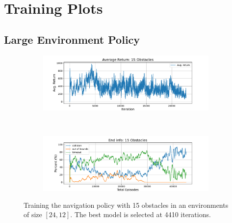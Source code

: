 \chapter{Training Plots}

\section{Large Environment Policy}
\begin{figure}[htb]
    \centering
    \begin{subfigure}[b]{\textwidth}
        \centering
        \captionsetup{justification=centering}
        \includegraphics[width=0.98\textwidth]{figures/7_/3DCarModel_BodyObs_NavSetup_15_NewObs_EnvSpace12_best3190_v1_again_reward.pdf}
        \label{fig:15_obst_nav_rew}
    \end{subfigure} \\
    \begin{subfigure}[b]{\textwidth}
        \centering
        \captionsetup{justification=centering}
        \includegraphics[width=0.98\textwidth]{figures/7_/3DCarModel_BodyObs_NavSetup_15_NewObs_EnvSpace12_best3190_v1_again_end_info.pdf}
        \label{fig:15_obst_nav_end}
    \end{subfigure} 
    \label{fig:7_train_nav_15_obst}
    \caption{Training the navigation policy with 15 obstacles in an environments of size  $[24, 12]$. The best model is selected at 4410 iterations.}
\end{figure}
